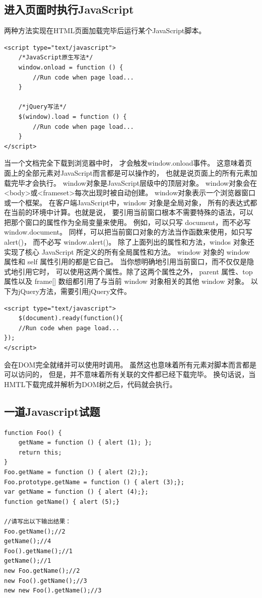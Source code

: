 \documentclass{book}
\begin{document}
\subsection{进入页面时执行JavaScript}

两种方法实现在HTML页面加载完毕后运行某个JavaScript脚本。

\begin{lstlisting}[language=VBSCript]
<script type="text/javascript">
	/*JavaScript原生写法*/    
    window.onload = function () {
        //Run code when page load...
    }
    
    /*jQuery写法*/
    $(window).load = function () {
    	//Run code when page load...
    }
</script>
\end{lstlisting}

当一个文档完全下载到浏览器中时，
才会触发window.onload事件。
这意味着页面上的全部元素对JavaScript而言都是可以操作的，
也就是说页面上的所有元素加载完毕才会执行。
window对象是JavaScript层级中的顶层对象。
window对象会在<body>或<frameset>每次出现时被自动创建。
window对象表示一个浏览器窗口或一个框架。
在客户端JavaScript中，window 对象是全局对象，
所有的表达式都在当前的环境中计算。也就是说，
要引用当前窗口根本不需要特殊的语法，可以把那个窗口的属性作为全局变量来使用。
例如，可以只写 document，而不必写 window.document。
同样，可以把当前窗口对象的方法当作函数来使用，如只写 alert()，
而不必写 window.alert()。
除了上面列出的属性和方法，windos 对象还实现了核心 JavaScript 所定义的所有全局属性和方法。
window 对象的 window 属性和 self 属性引用的都是它自己。
当你想明确地引用当前窗口，而不仅仅是隐式地引用它时，
可以使用这两个属性。除了这两个属性之外，
parent 属性、top 属性以及 frame[] 数组都引用了与当前 window 对象相关的其他 window 对象。
以下为jQuery方法，需要引用jQuery文件。 

\begin{lstlisting}[language=VBSCript]
<script type="text/javascript">
	$(document).ready(function(){ 
	//Run code when page load...
}); 
</script> 
\end{lstlisting}

会在DOM完全就绪并可以使用时调用。
虽然这也意味着所有元素对脚本而言都是可以访问的，
但是，并不意味着所有关联的文件都已经下载完毕。
换句话说，当HMTL下载完成并解析为DOM树之后，代码就会执行。

\subsection{一道Javascript试题}


\begin{lstlisting}[language=VBScript]
function Foo() {
    getName = function () { alert (1); };
    return this;
}
Foo.getName = function () { alert (2);};
Foo.prototype.getName = function () { alert (3);};
var getName = function () { alert (4);};
function getName() { alert (5);}

//请写出以下输出结果：
Foo.getName();//2
getName();//4
Foo().getName();//1
getName();//1
new Foo.getName();//2
new Foo().getName();//3
new new Foo().getName();//3
\end{lstlisting}
\end{document}
